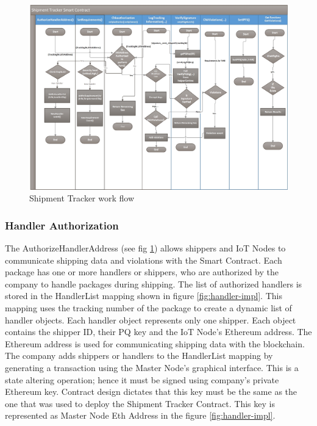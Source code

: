 \clearpage   
\begin{figure}[h]
	\centering
    \includegraphics[width=175mm,scale=1]{figs/sc-workflow}
	\caption{Shipment Tracker work flow}
	\label{fig:sc-workflow} 
\end{figure}
\vspace{0.5cm}

\subsubsection{Handler Authorization} \label{AuthHandlers}
The AuthorizeHandlerAddress (see fig \ref{fig:sc-workflow}) allows shippers and IoT Nodes to communicate shipping data and violations with the Smart Contract. Each package has one or more handlers or shippers, who are authorized by the company to handle packages during shipping. The list of authorized handlers is stored in the HandlerList mapping shown in figure \ref{fig:handler-impl}. This mapping uses the tracking number of the package to create a dynamic list of handler objects. Each handler object represents only one shipper. Each object contains the shipper ID, their PQ key and the IoT Node's Ethereum address. The Ethereum address is used for communicating shipping data with the blockchain. The company adds shippers or handlers to the HandlerList mapping by generating a transaction using the Master Node’s graphical interface. This is a state altering operation; hence it must be signed using company’s private Ethereum key. Contract design dictates that this key must be the same as the one that was used to deploy the Shipment Tracker Contract. This key is represented as Master Node Eth Address in the figure \ref{fig:handler-impl}. 
\clearpage


